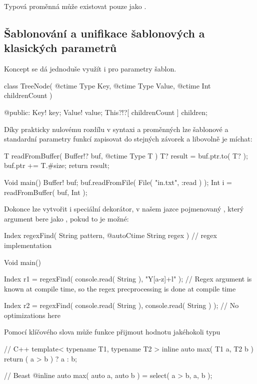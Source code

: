 Typová proměnná může existovat pouze jako \ctime.

\subsection{Šablonování a unifikace šablonových a klasických parametrů}
Koncept \ctime se dá jednoduše využít i pro parametry šablon.

\begin{code}
class TreeNode( @ctime Type Key, @ctime Type Value, @ctime Int childrenCount ) {
	
@public:
	Key! key;
	Value! value;
	This?!?[ childrenCount ] children;
	
}
\end{code}

Díky prakticky nulovému rozdílu v syntaxi \ctime a \nonctime proměnných lze šablonové a standardní parametry funkcí zapisovat do stejných závorek a libovolně je míchat:
\begin{code}
T readFromBuffer( Buffer!? buf, @ctime Type T ) {
	T? result = buf.ptr.to( T? );
	buf.ptr += T.#size;
	return result;
}

Void main() {
	Buffer! buf;
	buf.readFromFile( File( "in.txt", :read ) ); 
	Int i = readFromBuffer( buf, Int );
}
\end{code}

Dokonce lze vytvořit i speciální dekorátor, v našem jazce pojmenovaný , který argument bere jako \ctime, pokud to je možné:
\begin{code}
Index regexFind( String pattern, @autoCtime String regex ) {
	// regex implementation
}

Void main() {
	Index r1 = regexFind( console.read( String ), "Y[a-z]+l" ); // Regex argument is known at compile time, so the regex precprocessing is done at compile time
	
	Index r2 = regexFind( console.read( String ), console.read( String ) ); // No optimizations here
}
\end{code}

Pomocí klíčového slova  může funkce přijmout hodnotu jakéhokoli typu
\begin{cppcode}
// C++
template< typename T1, typename T2 >
inline auto max( T1 a, T2 b ) {
	return ( a  > b ) ? a : b;
}
\end{cppcode}

\begin{code}
// Beast
@inline auto max( auto a, auto b ) = select( a > b, a, b );
\end{code}


